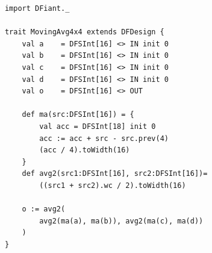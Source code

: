 \begin{table}[t!]
  \centering
  \begin{minipage}[t][23cm][t]{0.46\linewidth}
    \centering
    \captionsetup{justification=centering}    
    \begin{verbatim}
			import DFiant._
			
			trait MovingAvg4x4 extends DFDesign {
				val a    = DFSInt[16] <> IN init 0
				val b    = DFSInt[16] <> IN init 0
				val c    = DFSInt[16] <> IN init 0
				val d    = DFSInt[16] <> IN init 0
				val o    = DFSInt[16] <> OUT
				
				def ma(src:DFSInt[16]) = {
					val acc = DFSInt[18] init 0
					acc := acc + src - src.prev(4)
					(acc / 4).toWidth(16)
				}
				def avg2(src1:DFSInt[16], src2:DFSInt[16])=
					((src1 + src2).wc / 2).toWidth(16)
					
				o := avg2(
					avg2(ma(a), ma(b)), avg2(ma(c), ma(d))
				)
			}
			

\end{verbatim}
\end{minipage}
\end{table}
